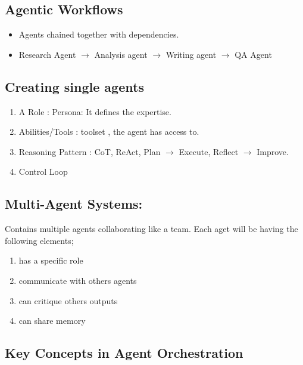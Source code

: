 \documentclass[10pt,a4paper]{article}
\begin{document}
\subsection{Agentic Workflows}\label{agentic-workflows}

\begin{itemize}
\item
  Agents chained together with dependencies.
\item
  Research Agent \(\rightarrow\) Analysis agent \(\rightarrow\) Writing agent \(\rightarrow\) QA Agent
\end{itemize}

\subsection{Creating single agents}\label{creating-single-agents}

\begin{enumerate}
\def\labelenumi{\arabic{enumi}.}
\item
  A Role : Persona: It defines the expertise.
\item
  Abilities/Tools : toolset , the agent has access to.
\item
  Reasoning Pattern : CoT, ReAct, Plan \(\rightarrow\) Execute, Reflect \(\rightarrow\) Improve.
\item
  Control Loop
\end{enumerate}

\subsection{Multi-Agent Systems:}\label{multi-agent-systems}

Contains multiple agents collaborating like a team. Each aget will be having the following elements;

\begin{enumerate}
\def\labelenumi{\arabic{enumi}.}

\item
  has a specific role
\item
  communicate with others agents
\item
  can critique others\textquotesingle{} outputs
\item
  can share memory
\end{enumerate}

\subsection{Key Concepts in Agent Orchestration}\label{key-concepts-in-agent-orchestration}
\end{document}
